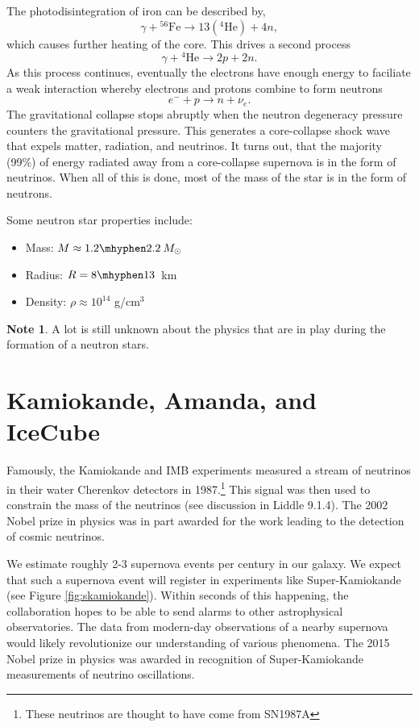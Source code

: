 \documentclass[a4paper,12pt]{article}
\theoremstyle{remark}
\newcommand{\mrm}[1]{\mathrm{#1}}
\renewcommand{\=}[1]{\stackrel{#1}{=}} %
\theoremstyle{plain}
\theoremstyle{definition}
\newtheorem*{definitionT}{Note}%
\newenvironment{note}{
\begin{dBox}
\begin{definitionT}}
{\end{definitionT}
\end{dBox}}
\begin{document}
The photodisintegration of iron can be described by,
\begin{equation}
\gamma + {}^{56}\mrm{Fe} \rightarrow 13({}^4\mrm{He}) + 4n,
\end{equation}
which causes further heating of the core. This drives a second process 
\begin{equation}
\gamma + {}^4 \mrm{He} \rightarrow 2p + 2n.
\end{equation}
As this process continues, eventually the electrons have enough energy to faciliate a weak interaction whereby electrons and protons combine to form neutrons
\begin{equation}
e^{-} + p \rightarrow n + \nu _e.
\end{equation} 
The gravitational collapse stops abruptly when the neutron degeneracy pressure counters the gravitational pressure. This generates a core-collapse shock wave that expels matter, radiation, and neutrinos. It turns out, that the majority (99\%) of energy radiated away from a core-collapse supernova is in the form of neutrinos. When all of this is done, most of the mass of the star is in the form of neutrons.

Some neutron star properties include:
\vspace{-7mm}
\begin{itemize}
\item Mass:  $M \approx 1.2 \mhyphen 2.2 \: M_\odot$
\item Radius: $R = 8 \mhyphen 13$~km
\item Density: $\rho \approx 10^{14}$ g/cm$^{3}$
\end{itemize}

\begin{note}
A lot is still unknown about the physics that are in play during the formation of a neutron stars. 
\end{note}

\section{Kamiokande, Amanda, and IceCube}
Famously, the Kamiokande and IMB experiments measured a stream of neutrinos in their water Cherenkov detectors in 1987.\footnote{These neutrinos are thought to have come from SN1987A} This signal was then used to constrain the mass of the neutrinos (see discussion in Liddle 9.1.4). The 2002 Nobel prize in physics was in part awarded for the work leading to the detection of cosmic neutrinos.

We estimate roughly 2-3 supernova events per century in our galaxy. We expect that such a supernova event will register in experiments like Super-Kamiokande (see Figure \ref{fig:skamiokande}). Within seconds of this happening, the collaboration hopes to be able to send alarms to other astrophysical observatories. The data from modern-day observations of a nearby supernova would likely revolutionize our understanding of various phenomena. The 2015 Nobel prize in physics was awarded in recognition of Super-Kamiokande measurements of neutrino oscillations. 
\end{document}
